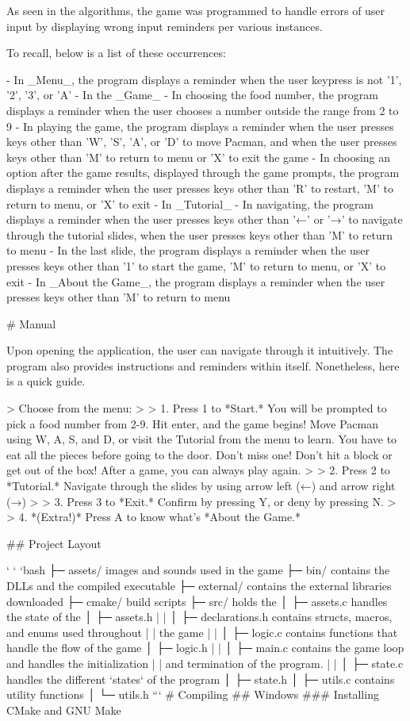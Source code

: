 As seen in the algorithms, the game was programmed to handle errors of user input by displaying wrong input reminders per various instances.

To recall, below is a list of these occurrences:

- In _Menu_, the program displays a reminder when the user keypress is not '1', '2', '3', or 'A'
- In the _Game_
  - In choosing the food number, the program displays a reminder when the user chooses a number outside the range from 2 to 9
  - In playing the game, the program displays a reminder when the user presses keys other than 'W', 'S', 'A', or 'D' to move Pacman, and when the user presses keys other than 'M' to return to menu or 'X' to exit the game
  - In choosing an option after the game results, displayed through the game prompts, the program displays a reminder when the user presses keys other than 'R' to restart, 'M' to return to menu, or 'X' to exit
- In _Tutorial_
  - In navigating, the program displays a reminder when the user presses keys other than '←' or '→' to navigate through the tutorial slides, when the user presses keys other than 'M' to return to menu
  - In the last slide, the program displays a reminder when the user presses keys other than '1' to start the game, 'M' to return to menu, or 'X' to exit
- In _About the Game_, the program displays a reminder when the user presses keys other than 'M' to return to menu

# Manual

Upon opening the application, the user can navigate through it intuitively. The program also provides instructions and reminders within itself. Nonetheless, here is a quick guide.

> Choose from the menu:
> 
> 1. Press 1 to *Start.* You will be prompted to pick a food number from 2-9. Hit enter, and the game begins! Move Pacman using W, A, S, and D, or visit the Tutorial from the menu to learn. You have to eat all the pieces before going to the door. Don’t miss one! Don’t hit a block or get out of the box! After a game, you can always play again.
> 
> 2. Press 2 to *Tutorial.* Navigate through the slides by using arrow left (←) and arrow right (→)
> 
> 3. Press 3 to *Exit.* Confirm by pressing Y, or deny by pressing N.
> 
> 4. *(Extra!)* Press A to know what's *About the Game.*


## Project Layout

` ` `bash
├─ assets/          	images and sounds used in the game
├─ bin/     		  	contains the DLLs and the compiled executable
├─ external/	      	  	contains the external libraries downloaded
├─ cmake/           	build scripts
├─ src/             	holds the 
│  ├─ assets.c      	handles the state of the 
│  ├─ assets.h     	
|  |
│  ├─ declarations.h  	contains structs, macros, and enums used throughout 
|  | 				the game
|  |
│  ├─ logic.c          	contains functions that handle the flow of the game
│  ├─ logic.h         	
|  |
│  ├─ main.c  		contains the game loop and handles the initialization 	|  | 				and termination of the program.
|  |
│  ├─ state.c  		handles the different `states` of the program
│  ├─ state.h  		
│  ├─ utils.c  		contains utility functions
│  └─ utils.h          	
```
# Compiling 
## Windows
### Installing CMake and GNU Make

